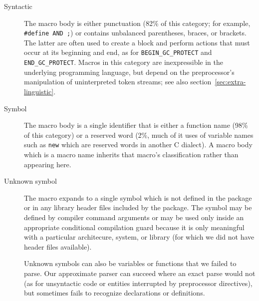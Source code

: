\begin{description}
\item[Syntactic]  The macro body is either punctuation (82\% of this
  category; for example, {\tt \#define AND ;}) or contains unbalanced
  parentheses, braces, or brackets.  The latter are often used to create a
  block and perform actions that must occur at its beginning and end, as
  for \verb|BEGIN_GC_PROTECT| and \verb|END_GC_PROTECT|.
  Macros in this category are inexpressible in the underlying programming
  language, but depend on the preprocessor's manipulation of uninterpreted
  token streams; see also section~\ref{sec:extra-linguistic}.


\item[Symbol]
  The macro body is a single identifier that is either a function name
  (98\% of this category) or a reserved word (2\%, much of it uses of
  variable names such as {\tt new} which are reserved words in another
  C dialect).  A macro body which is a macro name inherits that macro's
  classification rather than appearing here.


\item[Unknown symbol]
  The macro expands to a single symbol which is not defined in the package
  or in any library header files included by the package.  The symbol may
  be defined by compiler command arguments or may be used only inside an
  appropriate conditional compilation guard because it is only meaningful
  with a particular architecure, system, or library (for which we did not
  have header files available).
  
  Unknown symbols can also be variables or functions that we failed to
  parse.  Our approximate parser can succeed where an exact parse would not
  (as for unsyntactic code or entities interrupted by preprocessor
  directives), but sometimes fails to recognize declarations or
  definitions.



\end{description}
